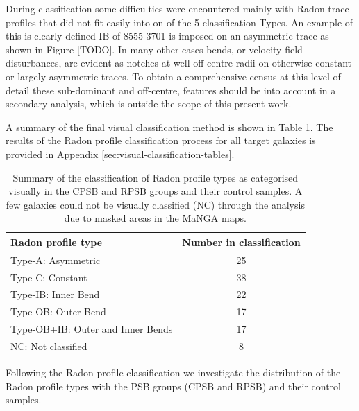 During classification some difficulties were encountered mainly with Radon trace profiles that did not fit easily into on of the 5 classification Types. An example of this is clearly defined IB of 8555-3701 is imposed on an asymmetric trace as shown in Figure [TODO]. In many other cases bends, or velocity field disturbances, are evident as notches at well off-centre radii on otherwise constant or largely asymmetric traces. To obtain a comprehensive census at this level of detail these sub-dominant and off-centre, features should be into account in a secondary analysis, which is outside the scope of this present work.

A summary of the final visual classification method is shown in Table \ref{tab:Radon-class-summary}. The results of the Radon profile classification process for all target galaxies is provided in Appendix \ref{sec:visual-classification-tables}. 

\begin{table}
    \centering
    \caption{Summary of the classification of Radon profile types as categorised visually in the CPSB and RPSB groups and their control samples. A few galaxies could not be visually classified (NC) through the analysis due to masked areas in the MaNGA maps.}
    \label{tab:Radon-class-summary}
    \begin{tabular}{lc}
    \hline
    Radon profile type & Number in classification \\
    \hline
    Type-A: Asymmetric & 25 \\
    Type-C: Constant & 38 \\
    Type-IB: Inner Bend & 22 \\
    Type-OB: Outer Bend & 17 \\
    Type-OB+IB: Outer and Inner Bends & 17 \\
    NC: Not classified & 8 \\
    \hline
    \end{tabular}
\end{table}

Following the Radon profile classification we investigate the distribution of the Radon profile types with the PSB groups (CPSB and RPSB) and their control samples. 



